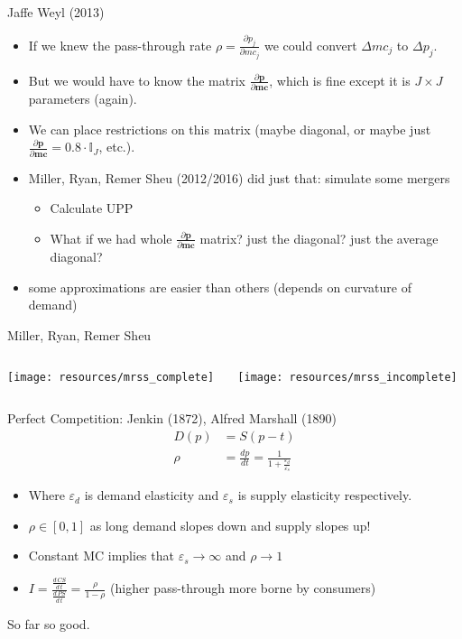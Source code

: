 \begin{frame}{Jaffe Weyl (2013)}
\begin{itemize}
\item If we knew the \alert{pass-through rate} $\rho = \frac{\partial p_j}{\partial mc_j}$ we could convert $\Delta mc_j$ to $\Delta p_j$.
\item But we would have to know the \alert{matrix} $\frac{\partial \symbf{p}}{\partial \symbf{mc}}$, which is fine except it is $J \times J$ parameters (again).
\item We can place restrictions on this matrix (maybe diagonal, or maybe just  $\frac{\partial \symbf{p}}{\partial \symbf{mc}}=0.8 \cdot \mathbb{I}_J$, etc.).
\item Miller, Ryan, Remer Sheu (2012/2016) did just that: simulate some mergers
\begin{itemize}
    \item Calculate UPP
    \item What if we had whole $\frac{\partial \symbf{p}}{\partial \symbf{mc}}$ matrix? just the diagonal? just the average diagonal?
\end{itemize}
\item some approximations are easier than others (depends on curvature of demand)
\end{itemize}
\end{frame}


\begin{frame}{Miller, Ryan, Remer Sheu}
\begin{columns}
\begin{column}{0.5\textwidth}
\texttt{[image: resources/mrss\_complete]}
\end{column}
\begin{column}{0.5\textwidth}
\texttt{[image: resources/mrss\_incomplete]}
\end{column}
\end{columns}
\end{frame}


\begin{frame}{Perfect Competition: Jenkin (1872), Alfred Marshall (1890)}
\begin{align*}
D(p) &= S(p-t)\\
\rho&= \frac{d p}{d t} = \frac{1}{1 + \frac{\varepsilon_d}{\varepsilon_s}}
\end{align*}

\begin{itemize}
\item Where $\varepsilon_d$ is \alert{demand elasticity} and $\varepsilon_s$ is \alert{supply elasticity} respectively.\\
\item $\rho \in [0,1]$ as long demand slopes down and supply slopes up!
\item Constant MC implies that $\varepsilon_s \rightarrow \infty$ and $\rho \rightarrow 1$
\item $I = \frac{\frac{d\, CS}{d\, t}}{\frac{d\, PS}{d\, t}} = \frac{\rho}{1-\rho}$ (higher pass-through more borne by consumers)
\end{itemize}
So far so good.
\end{frame}


